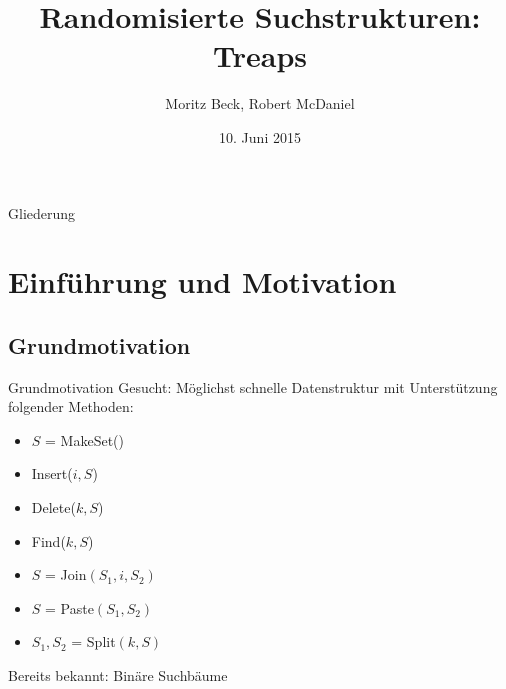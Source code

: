 \documentclass[t]{beamer}
\title[Treaps]{Randomisierte Suchstrukturen: Treaps}
\author[M. Beck, R. McDaniel]{Moritz Beck, Robert McDaniel}
\date[10.06.2015]{10. Juni 2015}
\theoremstyle{plain}
\begin{document}
{

\begin{frame}%
    \titlepage
\end{frame}

\begin{frame}{Gliederung}
    \tableofcontents
\end{frame}
}

\section{Einführung und Motivation}
\subsection{Grundmotivation}
\begin{frame}{Grundmotivation}
    Gesucht: Möglichst schnelle Datenstruktur mit Unterstützung folgender Methoden:
    \bigskip
    \begin{itemize}
        \item<2-> $S$ = MakeSet()
        \item<3-> Insert($i, S$)
        \item<4-> Delete($k, S$)
        \item<5-> Find($k, S$)
        \item<6-> $S$ = Join$(S_1, i, S_2)$
        \item<7-> $S$ = Paste$(S_1, S_2)$
        \item<8-> $S_1, S_2$ = Split$(k, S)$ 
    \end{itemize}
    \bigskip
     Bereits bekannt: Binäre Suchbäume
\end{frame}
\end{document}
